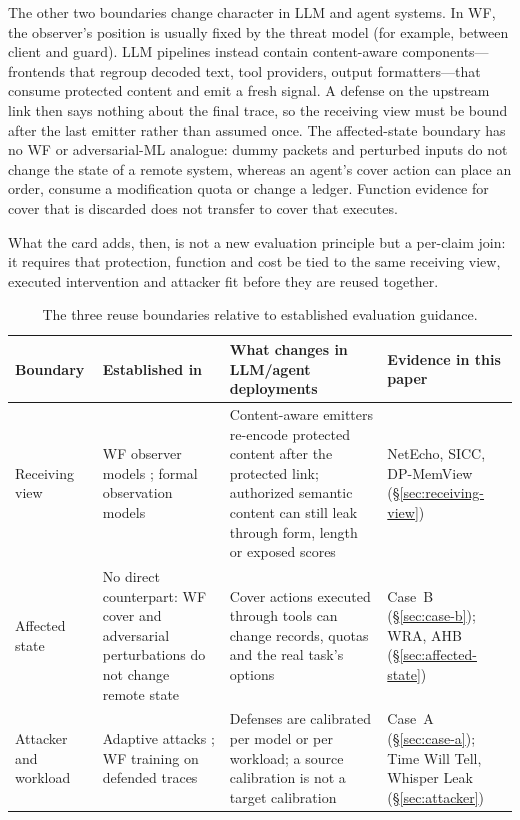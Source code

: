 The other two boundaries change character in LLM and agent systems. In WF, the observer's position is usually fixed by the threat model (for example, between client and guard). LLM pipelines instead contain content-aware components---frontends that regroup decoded text, tool providers, output formatters---that consume protected content and emit a fresh signal. A defense on the upstream link then says nothing about the final trace, so the receiving view must be bound after the last emitter rather than assumed once. The affected-state boundary has no WF or adversarial-ML analogue: dummy packets and perturbed inputs do not change the state of a remote system, whereas an agent's cover action can place an order, consume a modification quota or change a ledger. Function evidence for cover that is discarded does not transfer to cover that executes.

What the card adds, then, is not a new evaluation principle but a per-claim join: it requires that protection, function and cost be tied to the same receiving view, executed intervention and attacker fit before they are reused together.

\begin{table}[t]
\caption{The three reuse boundaries relative to established evaluation guidance.}\label{tab:guidance-comparison}
\centering\footnotesize
\begin{tabularx}{\textwidth}{@{}p{}YYp{.17\textwidth}@{}}\toprule
Boundary & Established in & What changes in LLM/agent deployments & Evidence in this paper\\\midrule
Receiving view & WF observer models \cite{juarez2014critical,mathews2023critical}; formal observation models \cite{almeida2016constanttime,smith2009qif} & Content-aware emitters re-encode protected content after the protected link; authorized semantic content can still leak through form, length or exposed scores & NetEcho, SICC, DP-MemView (\S\ref{sec:receiving-view})\\
Affected state & No direct counterpart: WF cover and adversarial perturbations do not change remote state & Cover actions executed through tools can change records, quotas and the real task's options & Case~B (\S\ref{sec:case-b}); WRA, AHB (\S\ref{sec:affected-state})\\
Attacker and workload & Adaptive attacks \cite{tramer2020adaptive,carlini2019evaluating}; WF training on defended traces \cite{juarez2014critical,cai2014systematic} & Defenses are calibrated per model or per workload; a source calibration is not a target calibration & Case~A (\S\ref{sec:case-a}); Time Will Tell, Whisper Leak (\S\ref{sec:attacker})\\
\bottomrule\end{tabularx}
\end{table}
